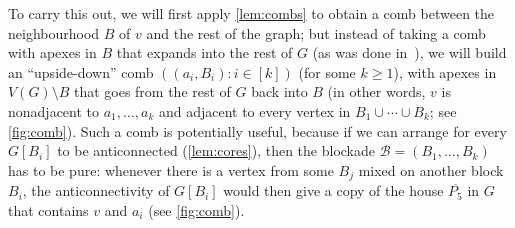 \documentclass[11pt,reqno,a4paper]{amsart}
\newcommand{\dd}{\textquotedblleft}
\newcommand{\ee}{\textquotedblright}
\newcommand{\mac}{\mathcal}
\begin{document}
	To carry this out, we will first apply \cref{lem:combs} to obtain a comb between the neighbourhood $B$ of $v$ and the rest of the graph;
	but instead of taking a comb with apexes in $B$ that expands into the rest of $G$ 
	(as was done in~\cite{MR4563865}),
	we will build an \dd upside-down\ee{} comb $((a_i,B_i):i\in[k])$ (for some $k\ge1$), with apexes in $V(G)\setminus B$
	that goes from the rest of $G$ back into $B$ (in other words, $v$ is nonadjacent to $a_1,\ldots,a_k$ and adjacent to every vertex in $B_1\cup\cdots\cup B_k$; see \cref{fig:comb}).
	Such a comb is potentially useful, because if we can arrange for every $G[B_i]$ to be anticonnected (\cref{lem:cores}), then the blockade $\mac B=(B_1,\ldots,B_k)$ has to be pure: whenever there is a vertex from some $B_j$ mixed on another block $B_i$, the anticonnectivity of $G[B_i]$ would then give a copy of the house $\overline{P_5}$ in $G$ that contains $v$ and $a_i$ (see \cref{fig:comb}).
	
	
	
\end{document}
